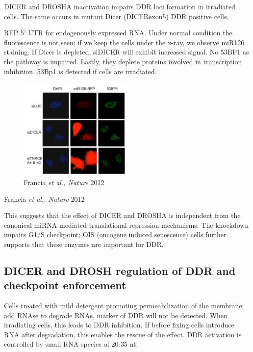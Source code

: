 DICER and DROSHA inactivation impairs DDR loci formation in irradiated cells. The same occurs in mutant Dicer (DICERexon5) DDR positive cells.

RFP 5' UTR for endogenously expressed RNA. Under normal condition the fluorescence is not seen; if we keep the cells under the x-ray, we observe miR126 staining. If Dicer is depleted, siDICER will exhibit increased signal. No 53BP1 as the pathway is impaired. Lastly, they deplete proteins involved in transcription inhibition. 53Bp1 is detected if cells are irradiated.

\begin{figure}
\centering
\includegraphics[width=0.5\textwidth]{Screen_Shot_2022-12-07_at_08-59-12.png}
\caption{Francia \emph{et al., Nature} 2012}
\end{figure}

Francia \emph{et al., Nature} 2012

This suggests that the effect of DICER and DROSHA is independent from the canonical miRNA-mediated translational repression mechanisms. The knockdown impairs G1/S checkpoint; OIS (oncogene induced senescence) cells further supports that these enzymes are important for DDR.

\hypertarget{dicer-and-drosh-regulation-of-ddr-and-checkpoint-enforcement}{%
\subsection{DICER and DROSH regulation of DDR and checkpoint enforcement}\label{dicer-and-drosh-regulation-of-ddr-and-checkpoint-enforcement}}

Cells treated with mild detergent promoting permeabilization of the membrane; add RNAse to degrade RNAs, marker of DDR will not be detected. When irradiating cells, this leads to DDR inhibition. If before fixing cells introduce RNA after degradation, this enables the rescue of the effect. DDR activation is controlled by small RNA species of 20-35 nt.

